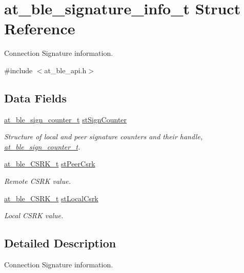 \hypertarget{structat__ble__signature__info__t}{}\section{at\+\_\+ble\+\_\+signature\+\_\+info\+\_\+t Struct Reference}
\label{structat__ble__signature__info__t}


Connection Signature information.  




{\ttfamily \#include $<$at\+\_\+ble\+\_\+api.\+h$>$}

\subsection*{Data Fields}
\begin{DoxyCompactItemize}
\item 
\mbox{\hyperlink{structat__ble__sign__counter__t}{at\+\_\+ble\+\_\+sign\+\_\+counter\+\_\+t}} \mbox{\hyperlink{structat__ble__signature__info__t_af42a5218c3cc8cba767a5ef11c40b8aa}{st\+Sign\+Counter}}
\begin{DoxyCompactList}\small\item\em Structure of local and peer signature counters and their handle, \mbox{\hyperlink{structat__ble__sign__counter__t}{at\+\_\+ble\+\_\+sign\+\_\+counter\+\_\+t}}. \end{DoxyCompactList}\item 
\mbox{\hyperlink{structat__ble___c_s_r_k__t}{at\+\_\+ble\+\_\+\+C\+S\+R\+K\+\_\+t}} \mbox{\hyperlink{structat__ble__signature__info__t_a5e7f9cfbc5e9b0f34fbd4b7572fcebf3}{st\+Peer\+Csrk}}
\begin{DoxyCompactList}\small\item\em Remote C\+S\+RK value. \end{DoxyCompactList}\item 
\mbox{\hyperlink{structat__ble___c_s_r_k__t}{at\+\_\+ble\+\_\+\+C\+S\+R\+K\+\_\+t}} \mbox{\hyperlink{structat__ble__signature__info__t_ad251af7cd858494e349a74151cdf021b}{st\+Local\+Csrk}}
\begin{DoxyCompactList}\small\item\em Local C\+S\+RK value. \end{DoxyCompactList}\end{DoxyCompactItemize}


\subsection{Detailed Description}
Connection Signature information. 

